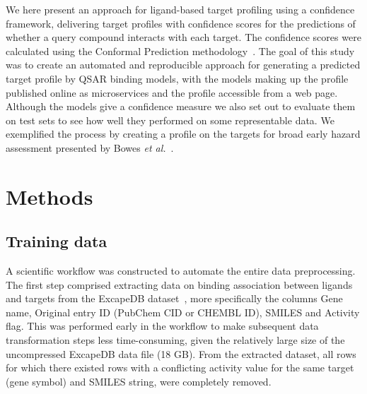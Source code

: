 \documentclass[utf8]{frontiersSCNS} %
\begin{document}
We here present an approach for ligand-based target profiling using a
confidence framework, delivering target profiles with confidence scores for the
predictions of whether a query compound interacts with each target. The
confidence scores were calculated using the Conformal Prediction
methodology~\cite{Vovk2005}.
%
The goal of this study was to create an automated and reproducible approach for
generating a predicted target profile by QSAR binding models, with the models
making up the profile published online as microservices and the profile
accessible from a web page. Although the models give a confidence measure we
also set out to evaluate them on test sets to see how well they performed on some
representable data. We exemplified the process by creating a profile on the
targets for broad early hazard assessment presented by Bowes \textit{et
al.}~\cite{Bowes2012}.

\section*{Methods}

\subsection*{Training data}

A scientific workflow was constructed to automate the entire data
preprocessing.  The first step comprised extracting data on binding association
between ligands and targets from the ExcapeDB dataset~\cite{Sun2017}, more
specifically the columns Gene name, Original entry ID (PubChem CID or CHEMBL
ID), SMILES and Activity flag. This was performed early in the workflow to make
subsequent data transformation steps less time-consuming, given the relatively large
size of the uncompressed ExcapeDB data file (18 GB).
%
From the extracted dataset, all rows for which there existed rows with a conflicting
activity value for the same target (gene symbol) and SMILES string, were completely removed.
\end{document}
